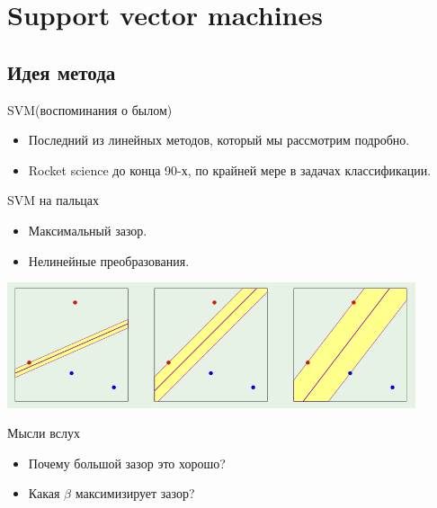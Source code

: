 \documentclass[14pt, fleqn, xcolor={dvipsnames, table}]{beamer}
\begin{document}
\section{Support vector machines}
\subsection{Идея метода}
\begin{frame}{SVM(воспоминания о былом)}
\begin{itemize}
  \item Последний из линейных методов, который мы рассмотрим подробно.
  \item Rocket science до конца 90-х, по крайней мере в задачах классификации.
\end{itemize}
\end{frame}

\begin{frame}{SVM на пальцах}
\begin{itemize}
  \item Максимальный зазор.
  \item Нелинейные преобразования.
\end{itemize}
\begin{center}
\includegraphics[width=0.9\textwidth]{SVM_1.png}
\end{center}
\end{frame}

\begin{frame}{Мысли вслух}
\begin{itemize}
  \item Почему большой зазор это хорошо?
  \item Какая $\beta$ максимизирует зазор? 
\end{itemize}
\end{frame}
\end{document}
